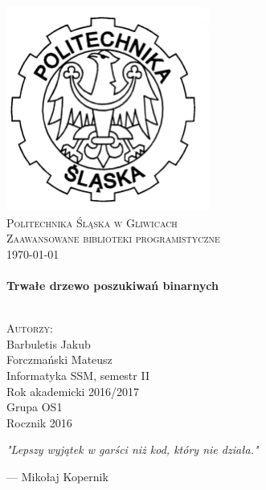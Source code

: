 \begin{titlepage}
	\begin{center}
		
		\includegraphics[width=0.5\textwidth]{./img/logo}~\\[1cm]
		
		\textsc{\LARGE Politechnika Śląska w Gliwicach}\\[1.5cm]
		
		\textsc{\Large Zaawansowane biblioteki programistyczne}\\
		\textsc{\today}\\[0.5cm]
		
		\HRule \\[0.4cm]
		{ \huge \bfseries Trwałe drzewo poszukiwań binarnych  \\[0.4cm] }
		
		\HRule \\[1.2cm]
		
		\textsc{\Large Autorzy:} \\
		{\large Barbuletis Jakub} \\
		{\large Forczmański Mateusz} \\[0.4cm]
		
		Informatyka SSM, semestr II \\
		Rok akademicki 2016/2017 \\
		Grupa OS1\\
		Rocznik 2016\\[1.2cm]
		\epigraph{
			\textit{"Lepszy wyjątek w garści niż kod, który nie działa."}
		}{
		--- Mikołaj Kopernik}
		\vfill
		
	\end{center}
\end{titlepage}